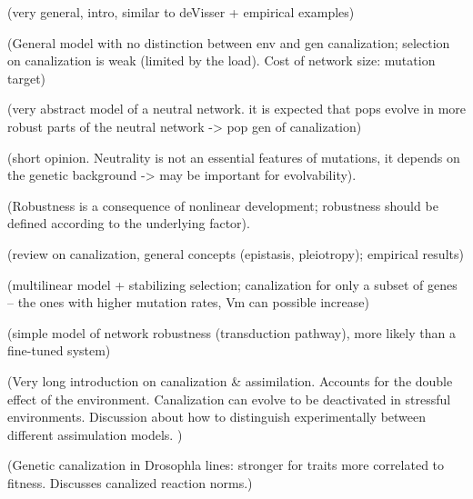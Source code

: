 \documentclass[a4paper]{article}
\begin{document}
\citep{MS09} (very general, intro, similar to deVisser + empirical examples) 

\citep{MT10} 

\citep{PP05}  (General model with no distinction between env and gen canalization; selection on canalization is weak (limited by the load). Cost of network size: mutation target) 

\citep{VCH99} (very abstract model of a neutral network. it is expected that pops evolve in more robust parts of the neutral network -> pop gen of canalization)

\citep{ALS+06} 

\citep{Wag05} (short opinion. Neutrality is not an essential features of mutations, it depends on the genetic background -> may be important for evolvability). 

\citep{KF09} 

\citep{WBB97} 

\citep{MH02} 

\citep{GW00} 

\citep{MHB+03} 

\citep{Nij02} (Robustness is a consequence of nonlinear development; robustness should be defined according to the underlying factor).

\citep{BS03} 

\citep{Fla05} (review on canalization, general concepts (epistasis, pleiotropy); empirical results) 

\citep{BPK06} 

\citep{Wad42} 

\citep{Wad59} 

\citep{GH94}

\citep{HHW03} (multilinear model + stabilizing selection; canalization for only a subset of genes -- the ones with higher mutation rates, Vm can possible increase)

\citep{BL97} (simple model of network robustness (transduction pathway), more likely than a fine-tuned system) 

\citep{Fra99} 

\citep{EM98} (Very long introduction on canalization \& assimilation. Accounts for the double effect of the environment. Canalization can evolve to be deactivated in stressful environments. Discussion about how to distinguish experimentally between different assimulation models. )

\citep{Ste02}

\citep{SK94} (Genetic canalization in Drosophla lines: stronger for traits more correlated to fitness. Discusses canalized reaction norms.)
\end{document}
